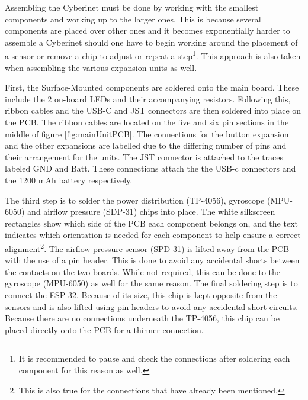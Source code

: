Assembling the Cyberinet must be done by working with the smallest components and working up to the larger ones. This is because several components are placed over other ones and it becomes exponentially harder to assemble a Cyberinet should one have to begin working around the placement of a sensor or remove a chip to adjust or repeat a step\footnote{It is recommended to pause and check the connections after soldering each component for this reason as well.}. This approach is also taken when assembling the various expansion units as well.

First, the Surface-Mounted components are soldered onto the main board. These include the 2 on-board LEDs and their accompanying resistors. Following this, ribbon cables and the USB-C and JST connectors are then soldered into place on the PCB. The ribbon cables are located on the five and six pin sections in the middle of figure \ref{fig:mainUnitPCB}. The connections for the button expansion and the other expansions are labelled due to the differing number of pins and their arrangement for the units. The JST connector is attached to the traces labeled GND and Batt. These connections attach the the USB-c connectors and the 1200 mAh battery respectively.

The third step is to solder the power distribution (TP-4056), gyroscope (MPU-6050) and airflow pressure (SDP-31) chips into place. The white silkscreen rectangles show which side of the PCB each component belongs on, and the text indicates which orientation is needed for each component to help ensure a correct alignment\footnote{This is also true for the connections that have already been mentioned.}. The airflow pressure sensor (SPD-31) is lifted away from the PCB with the use of a pin header. This is done to avoid any accidental shorts between the contacts on the two boards. While not required, this can be done to the gyroscope (MPU-6050) as well for the same reason. The final soldering step is to connect the ESP-32. Because of its size, this chip is kept opposite from the sensors and is also lifted using pin headers to avoid any accidental short circuits. Because there are no connections underneath the TP-4056, this chip can be placed directly onto the PCB for a thinner connection.


